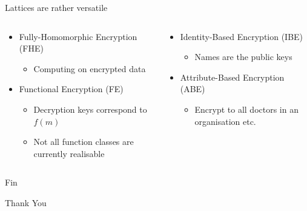 \documentclass[xcolor=table,10pt,aspectratio=169]{beamer}
\begin{document}
\begin{frame}[label={sec:orgac94476}]{Lattices are rather versatile}
\begin{columns}[t]
\begin{column}{0.5\columnwidth}
\begin{itemize}
\item Fully-Homomorphic Encryption (FHE)
\begin{itemize}
\item Computing on encrypted data
\end{itemize}

\item Functional Encryption (FE)
\begin{itemize}
\item Decryption keys correspond to \(f(m)\)
\item Not all function classes are currently realisable
\end{itemize}
\end{itemize}
\end{column}

\begin{column}{0.5\columnwidth}
\begin{itemize}
\item Identity-Based Encryption (IBE)
\begin{itemize}
\item Names \alert{are} the public keys
\end{itemize}
\item Attribute-Based Encryption (ABE)
\begin{itemize}
\item Encrypt to all doctors in an organisation etc.
\end{itemize}
\end{itemize}
\end{column}
\end{columns}
\end{frame}
\begin{frame}[label={sec:orga0a3fae},standout]{Fin}
\begin{center}
\Huge \alert{Thank You}
\end{center}
\end{frame}
\end{document}
